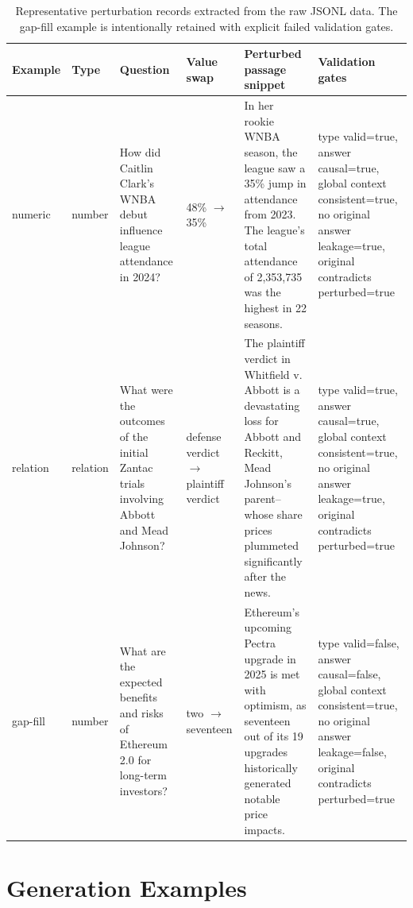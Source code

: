\documentclass[11pt]{article}
\begin{document}
\begin{table}[h]
\centering
\scriptsize
\begin{tabularx}{\linewidth}{L{1.15cm}L{1.25cm}L{2.9cm}L{1.8cm}Y Y}
\toprule
\textbf{Example} & \textbf{Type} & \textbf{Question} & \textbf{Value swap} & \textbf{Perturbed passage snippet} & \textbf{Validation gates} \\
\midrule
numeric & number & How did Caitlin Clark's WNBA debut influence league attendance in 2024? & 48\% $\rightarrow$ 35\% & In her rookie WNBA season, the league saw a 35\% jump in attendance from 2023. The league's total attendance of 2,353,735 was the highest in 22 seasons. & type valid=true, answer causal=true, global context consistent=true, no original answer leakage=true, original contradicts perturbed=true \\
relation & relation & What were the outcomes of the initial Zantac trials involving Abbott and Mead Johnson? & defense verdict $\rightarrow$ plaintiff verdict & The plaintiff verdict in Whitfield v. Abbott is a devastating loss for Abbott and Reckitt, Mead Johnson's parent--whose share prices plummeted significantly after the news. & type valid=true, answer causal=true, global context consistent=true, no original answer leakage=true, original contradicts perturbed=true \\
gap-fill & number & What are the expected benefits and risks of Ethereum 2.0 for long-term investors? & two $\rightarrow$ seventeen & Ethereum's upcoming Pectra upgrade in 2025 is met with optimism, as seventeen out of its 19 upgrades historically generated notable price impacts. & type valid=false, answer causal=false, global context consistent=true, no original answer leakage=false, original contradicts perturbed=true \\
\bottomrule
\end{tabularx}
\caption{Representative perturbation records extracted from the raw JSONL data. The gap-fill example is intentionally retained with explicit failed validation gates.}
\end{table}

\section{Generation Examples}
\label{app:generation_examples}
\end{document}
